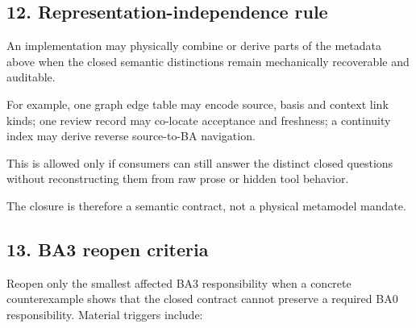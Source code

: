 \documentclass[11pt,a4paper]{article}
\begin{document}
\subsection{12. Representation-independence rule}\label{representation-independence-rule}

An implementation may physically combine or derive parts of the metadata above when the closed semantic distinctions remain mechanically recoverable and auditable.

For example, one graph edge table may encode source, basis and context link kinds; one review record may co-locate acceptance and freshness; a continuity index may derive reverse source-to-BA navigation.

This is allowed only if consumers can still answer the distinct closed questions without reconstructing them from raw prose or hidden tool behavior.

The closure is therefore a semantic contract, not a physical metamodel mandate.

\subsection{13. BA3 reopen criteria}\label{ba3-reopen-criteria}

Reopen only the smallest affected BA3 responsibility when a concrete counterexample shows that the closed contract cannot preserve a required BA0 responsibility. Material triggers include:
\end{document}
